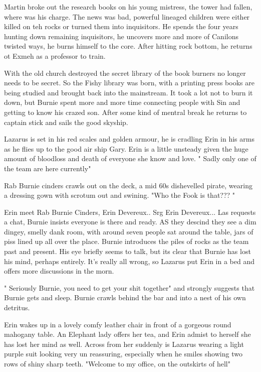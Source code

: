 Martin broke out the research books on his young mistress, the tower had fallen, where was his charge. The news was bad, powerful lineaged children were either killed on teh rocks or turned them into inquisitors. He spends the four years hunting down remaining inquisitors, he uncovers more and more of Canilons twisted ways, he burns himself to the core. After hitting rock bottom, he returns ot Exmeh as a professor to train.\medskip

With the old church destroyed the secret library of the book burners no longer needs to be secret. So the Fishy library was born, with a printing press books are being studied and brought back into the mainstream. It took a lot not to burn it down, but Burnie spent more and more time connecting people with Sin and getting to know his crazed son. After some kind of mentral break he returns to captain stick and sails the good skyship.\medskip

Lazarus is set in his red scales and golden armour, he is cradling Erin in his arms as he flies up to the good air ship Gary. Erin is a little unsteady given the huge amount of bloodloss and death of everyone she know and love. " Sadly only one of the team are here currently"\medskip

Rab Burnie cinders crawls out on the deck, a mid 60s dishevelled pirate, wearing a dressing gown with scrotum out and swining. "Who the Fook is that??? "\medskip

Erin meet Rab Burnie Cinders, Erin Devereux.. Srg Erin Devereux... Las requests a chat, Burnie insists everyone is there and ready. AS they descind they see a dim dingey, smelly dank room, with around seven people sat around the table, jars of piss lined up all over the place. Burnie introduces the piles of rocks as the team past and present. His eye briefly seems to talk, but its clear that Burnie has lost his mind, perhaps entirely. It's really all wrong, so Lazarus put Erin in a bed and offers more discussions in the morn.\medskip

" Seriously Burnie, you need to get your shit together" and strongly suggests that Burnie gets and sleep. Burnie crawls behind the bar and into a nest of his own detritus.\medskip

Erin wakes up in a lovely comfy leather chair in front of a gorgeous round mahogany table. An Elephant lady offers her tea, and Erin admist to herself she has lost her mind as well. Across from her suddenly is Lazarus wearing a light purple suit looking very un reassuring, especially when he smiles showing two rows of shiny sharp teeth. "Welcome to my office, on the outskirts of hell"\medskip

